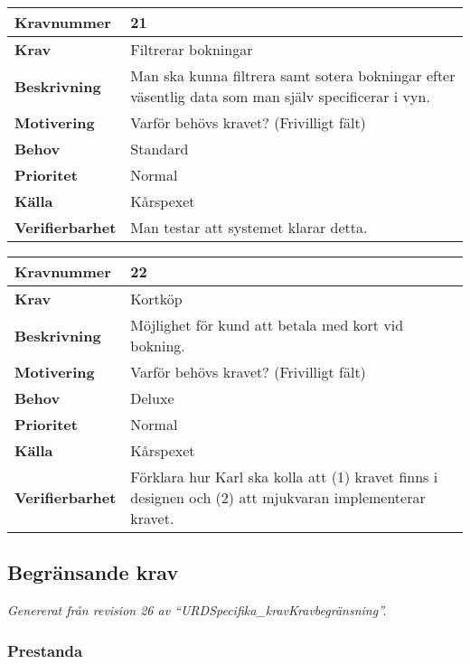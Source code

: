 \documentclass[a4paper, twoside, 11pt, titlepage]{article}
\begin{document}
\begin{tabular} { | p{3cm} | p{12.2cm} | }
	\hline
	\textbf{Kravnummer} & 21  \\
	\hline
	\textbf{Krav} & Filtrerar bokningar  \\
	\hline
	\textbf{Beskrivning} & Man ska kunna filtrera samt sotera bokningar efter väsentlig data som man själv specificerar i vyn.   \\
	\hline
	\textbf{Motivering} & Varför behövs kravet? (Frivilligt fält)  \\
	\hline
	\textbf{Behov} & Standard  \\
	\hline
	\textbf{Prioritet} & Normal  \\
	\hline
	\textbf{Källa} & Kårspexet  \\
	\hline
	\textbf{Verifierbarhet} & Man testar att systemet klarar detta.  \\
	\hline
\end{tabular}

\begin{tabular} { | p{3cm} | p{12.2cm} | }
	\hline
	\textbf{Kravnummer} & 22  \\
	\hline
	\textbf{Krav} & Kortköp  \\
	\hline
	\textbf{Beskrivning} & Möjlighet för kund att betala med kort vid bokning.  \\
	\hline
	\textbf{Motivering} & Varför behövs kravet? (Frivilligt fält)  \\
	\hline
	\textbf{Behov} & Deluxe  \\
	\hline
	\textbf{Prioritet} & Normal  \\
	\hline
	\textbf{Källa} & Kårspexet  \\
	\hline
	\textbf{Verifierbarhet} & Förklara hur Karl ska kolla att (1) kravet finns i designen och (2) att mjukvaran implementerar kravet.  \\
	\hline
\end{tabular}


	\subsection{Begränsande krav}


	\emph{Genererat från revision 26 av ``URDSpecifika\_kravKravbegränsning''.}

	\subsubsection{Prestanda}
\end{document}
